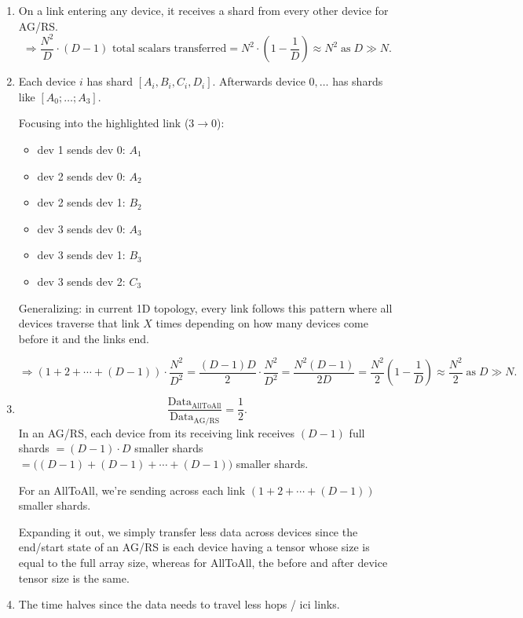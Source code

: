 \documentclass[11pt]{article}
\begin{document}
\begin{enumerate}
  \item On a link entering any device, it receives a shard from every other device for AG/RS.
  \[
  \Rightarrow \frac{N^2}{D} \cdot (D-1) \text{ total scalars transferred} = N^2 \cdot \left(1 - \frac{1}{D}\right) \approx N^2 \;\text{as}\; D \gg N.
  \]

  \item Each device $i$ has shard $[A_i, B_i, C_i, D_i]$. Afterwards device $0,\ldots$ has shards like $[A_0;\ldots;A_3]$.

  Focusing into the highlighted link ($3 \to 0$):
  \begin{itemize}[leftmargin=*]
    \item dev 1 sends dev 0: $A_1$
    \item dev 2 sends dev 0: $A_2$
    \item dev 2 sends dev 1: $B_2$
    \item dev 3 sends dev 0: $A_3$
    \item dev 3 sends dev 1: $B_3$
    \item dev 3 sends dev 2: $C_3$
  \end{itemize}

  Generalizing: in current 1D topology, every link follows this pattern where all devices traverse that link $X$ times depending on how many devices come before it and the links end.

  \[
  \Rightarrow (1 + 2 + \cdots + (D-1)) \cdot \frac{N^2}{D^2} = \frac{(D-1)D}{2} \cdot \frac{N^2}{D^2} = \frac{N^2 (D-1)}{2D}
  = \frac{N^2}{2}\left(1 - \frac{1}{D}\right) \approx \frac{N^2}{2} \;\text{as}\; D \gg N.
  \]

  \item
  \[
  \frac{\text{Data}_{\text{AllToAll}}}{\text{Data}_{\text{AG/RS}}} = \frac{1}{2}.
  \]
  In an AG/RS, each device from its receiving link receives $(D-1)$ full shards $= (D-1) \cdot D$ smaller shards $= \big((D-1) + (D-1) + \cdots + (D-1)\big)$ smaller shards.

  For an AllToAll, we're sending across each link $(1 + 2 + \cdots + (D-1))$ smaller shards.

  Expanding it out, we simply transfer less data across devices since the end/start state of an AG/RS is each device having a tensor whose size is equal to the full array size, whereas for AllToAll, the before and after device tensor size is the same.

  \item The time halves since the data needs to travel less hops / ici links.


\end{enumerate}
\end{document}
